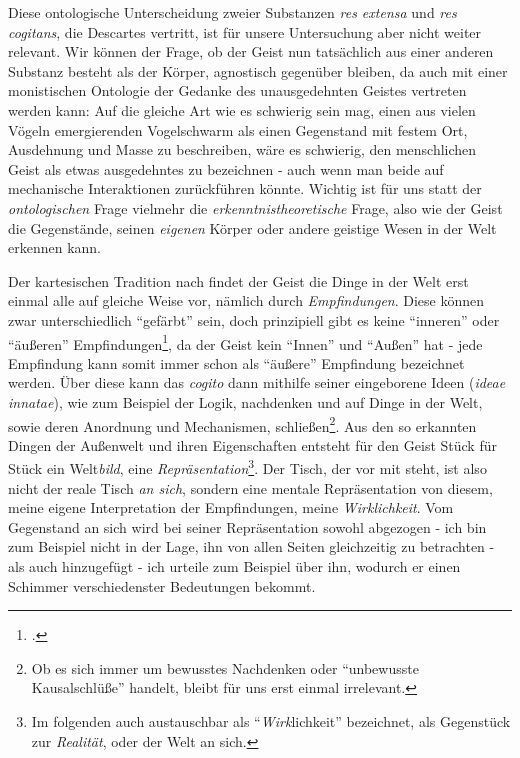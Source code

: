 \documentclass[a4paper, 12pt]{article}
\begin{document}
\begin{onehalfspace}
Diese ontologische Unterscheidung zweier Substanzen \emph{res extensa} und \emph{res cogitans}, die Descartes vertritt, ist für unsere Untersuchung aber nicht weiter relevant. Wir können der Frage, ob der Geist nun tatsächlich aus einer anderen Substanz besteht als der Körper, agnostisch gegenüber bleiben, da auch mit einer monistischen Ontologie der Gedanke des unausgedehnten Geistes vertreten werden kann: Auf die gleiche Art wie es schwierig sein mag, einen aus vielen Vögeln emergierenden Vogelschwarm als einen Gegenstand mit festem Ort, Ausdehnung und Masse zu beschreiben, wäre es schwierig, den menschlichen Geist als etwas ausgedehntes zu bezeichnen - auch wenn man beide auf mechanische Interaktionen zurückführen könnte. Wichtig ist für uns statt der \emph{ontologischen} Frage vielmehr die \emph{erkenntnistheoretische} Frage, also wie der Geist die Gegenstände, seinen \emph{eigenen} Körper oder andere geistige Wesen in der Welt erkennen kann.


Der kartesischen Tradition nach findet der Geist die Dinge in der Welt erst einmal alle auf gleiche Weise vor, nämlich durch \emph{Empfindungen}. Diese können zwar unterschiedlich "`gefärbt"' sein, doch prinzipiell gibt es keine "`inneren"' oder "`äußeren"' Empfindungen\footnote{\Cite[Vgl.][S. ?? (501?)]{scheler-ethik}.}, da der Geist kein "`Innen"' und "`Außen"' hat - jede Empfindung kann somit immer schon als "`äußere"' Empfindung bezeichnet werden. Über diese kann das \emph{cogito} dann mithilfe seiner eingeborene Ideen (\emph{ideae innatae}), wie zum Beispiel der Logik, nachdenken und auf Dinge in der Welt, sowie deren Anordnung und Mechanismen, schließen\footnote{Ob es sich immer um bewusstes Nachdenken oder "`unbewusste Kausalschlüße"' handelt, bleibt für uns erst einmal irrelevant.}. Aus den so erkannten Dingen der Außenwelt und ihren Eigenschaften entsteht für den Geist Stück für Stück ein Welt\emph{bild}, eine \emph{Repräsentation}\footnote{Im folgenden auch austauschbar als "`\emph{Wirk}lichkeit"' bezeichnet, als Gegenstück zur \emph{Realität}, oder der Welt an sich.}. Der Tisch, der vor mit steht, ist also nicht der reale Tisch \emph{an sich}, sondern eine mentale Repräsentation von diesem, meine eigene Interpretation der Empfindungen, meine \emph{Wirklichkeit}. Vom Gegenstand an sich wird bei seiner Repräsentation sowohl abgezogen - ich bin zum Beispiel nicht in der Lage, ihn von allen Seiten gleichzeitig zu betrachten - als auch hinzugefügt - ich urteile zum Beispiel über ihn, wodurch er einen Schimmer verschiedenster Bedeutungen bekommt.


\end{onehalfspace}
\end{document}
